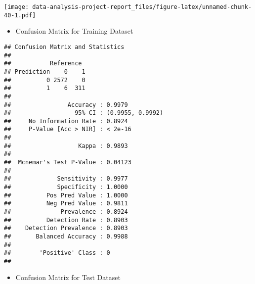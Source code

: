 \documentclass[
]{article}
\newenvironment{Shaded}{\begin{snugshade}}{\end{snugshade}}
\newcommand{\KeywordTok}[1]{\textcolor[rgb]{0.13,0.29,0.53}{\textbf{#1}}}
\newcommand{\NormalTok}[1]{#1}
\newcommand{\OperatorTok}[1]{\textcolor[rgb]{0.81,0.36,0.00}{\textbf{#1}}}
\providecommand{\tightlist}{%
  \setlength{\itemsep}{0pt}\setlength{\parskip}{0pt}}
\begin{document}
\texttt{[image: data-analysis-project-report\_files/figure-latex/unnamed-chunk-40-1.pdf]}

\begin{itemize}
\tightlist
\item
  Confusion Matrix for Training Dataset
\end{itemize}

\begin{Shaded}
\end{Shaded}

\begin{verbatim}
## Confusion Matrix and Statistics
## 
##           Reference
## Prediction    0    1
##          0 2572    0
##          1    6  311
##                                           
##                Accuracy : 0.9979          
##                  95% CI : (0.9955, 0.9992)
##     No Information Rate : 0.8924          
##     P-Value [Acc > NIR] : < 2e-16         
##                                           
##                   Kappa : 0.9893          
##                                           
##  Mcnemar's Test P-Value : 0.04123         
##                                           
##             Sensitivity : 0.9977          
##             Specificity : 1.0000          
##          Pos Pred Value : 1.0000          
##          Neg Pred Value : 0.9811          
##              Prevalence : 0.8924          
##          Detection Rate : 0.8903          
##    Detection Prevalence : 0.8903          
##       Balanced Accuracy : 0.9988          
##                                           
##        'Positive' Class : 0               
## 
\end{verbatim}

\begin{itemize}
\tightlist
\item
  Confusion Matrix for Test Dataset
\end{itemize}

\begin{Shaded}
\end{Shaded}
\end{document}
